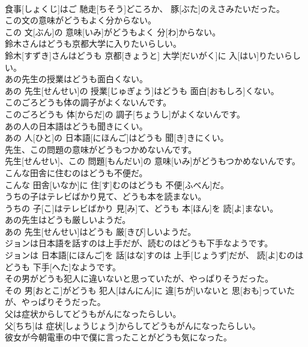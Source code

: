 \documentclass[8pt]{extreport}
\begin{document}
\begin{CJK}{UTF8}{min}
\\	食事[しょくじ]はご 馳走[ちそう]どころか、 豚[ぶた]のえさみたいだった。
\\	この文の意味がどうもよく分からない。	
\\	この 文[ぶん]の 意味[いみ]がどうもよく 分[わ]からない。
\\	鈴木さんはどうも京都大学に入りたいらしい。	
\\	鈴木[すずき]さんはどうも 京都[きょうと] 大学[だいがく]に 入[はい]りたいらしい。
\\	あの先生の授業はどうも面白くない。	
\\	あの 先生[せんせい]の 授業[じゅぎょう]はどうも 面白[おもしろ]くない。
\\	このごろどうも体の調子がよくないんです。	
\\	このごろどうも 体[からだ]の 調子[ちょうし]がよくないんです。
\\	あの人の日本語はどうも聞きにくい。	
\\	あの 人[ひと]の 日本語[にほんご]はどうも 聞[き]きにくい。
\\	先生、この問題の意味がどうもつかめないんです。	
\\	先生[せんせい]、この 問題[もんだい]の 意味[いみ]がどうもつかめないんです。
\\	こんな田舎に住むのはどうも不便だ。	
\\	こんな 田舎[いなか]に 住[す]むのはどうも 不便[ふべん]だ。
\\	うちの子はテレビばかり見て、どうも本を読まない。	
\\	うちの 子[こ]はテレビばかり 見[み]て、どうも 本[ほん]を 読[よ]まない。
\\	あの先生はどうも厳しいようだ。	
\\	あの 先生[せんせい]はどうも 厳[きび]しいようだ。
\\	ジョンは日本語を話すのは上手だが、読むのはどうも下手なようです。	
\\	ジョンは 日本語[にほんご]を 話[はな]すのは 上手[じょうず]だが、 読[よ]むのはどうも 下手[へた]なようです。
\\	その男がどうも犯人に違いないと思っていたが、やっぱりそうだった。	
\\	その 男[おとこ]がどうも 犯人[はんにん]に 違[ちが]いないと 思[おも]っていたが、やっぱりそうだった。
\\	父は症状からしてどうもがんになったらしい。	
\\	父[ちち]は 症状[しょうじょう]からしてどうもがんになったらしい。
\\	彼女が今朝電車の中で僕に言ったことがどうも気になった。	

\end{CJK}
\end{document}
